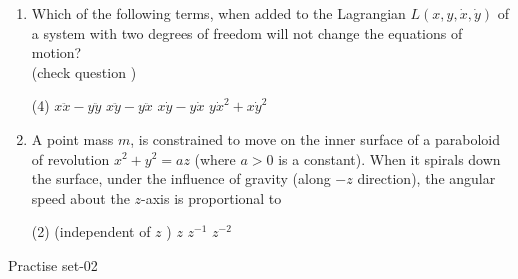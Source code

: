 \begin{enumerate}
	The particle of mass in on the plane undergoes a circular motion with radius $r_{0}$ and angular momentum $L$. When a small radial displacement $\in$ (whew $\in \ll<r_{0}$ ) is applied, its radial coordinate is found to oscillate about $r_{0}$. The frequency of the oscillations is
	{}
	\begin{tasks}(2)
		\task[\textbf{A.}] $\sqrt{\frac{7 m_{2} g}{\left(m_{1}+\frac{m_{2}}{2}\right) r_{0}}}$
		\task[\textbf{B.}] $\sqrt{\frac{7 m_{2} g}{\left(m_{1}+m_{2}\right) r_{0}}}$
		\task[\textbf{C.}] $\sqrt{\frac{3 m_{2} g}{\left(m_{1}+\frac{m_{2}}{2}\right) r_{0}}}$
		\task[\textbf{D.}] $\sqrt{\frac{3 m_{2} g}{\left(m_{1}+m_{2}\right) r_{0}}}$
	\end{tasks}	
	\item Which of the following terms, when added to the Lagrangian $L(x, y, \dot{x}, \dot{y})$ of a system with two degrees of freedom will not change the equations of motion?\\
	(check question )
	{}
	\begin{tasks}(4)
		\task[\textbf{A.}] $x \ddot{x}-y \ddot{y}$
		\task[\textbf{B.}] $x \ddot{y}-y \ddot{x}$
		\task[\textbf{C.}] $x \dot{y}-y \dot{x}$
		\task[\textbf{D.}] $y \dot{x}^{2}+x \dot{y}^{2}$ 
	\end{tasks}
	\item A point mass $m$, is constrained to move on the inner surface of a paraboloid of revolution $x^{2}+y^{2}=a z$ (where $a>0$ is a constant). When it spirals down the surface, under the influence of gravity (along $-z$ direction), the angular speed about the $z$-axis is proportional to
	{}
	\begin{tasks}(2)
		 (independent of $z$ )
		\task[\textbf{B.}] $z$
		\task[\textbf{C.}]  $z^{-1}$
		\task[\textbf{D.}] $z^{-2}$
	\end{tasks}	
\end{enumerate}
\newpage
\begin{abox}
	Practise set-02
\end{abox}
